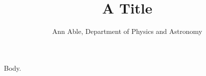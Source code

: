 \documentclass{amsart}
\begin{document}
\title{A Title}
\author{Ann Able, Department of Physics and Astronomy}
\maketitle
Body.
\end{document}
